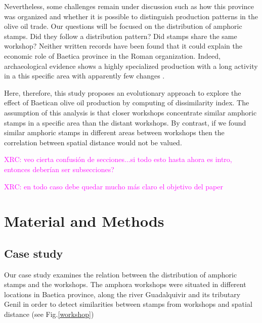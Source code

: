 \documentclass[review]{elsarticle}
\newcommand{\memo}[2]{\textcolor{#1}{#2}}
\newcommand{\xavi}[1]{\memo{magenta}{XRC: #1\\}}
\begin{document}
Nevertheless, some challenges remain under discussion such as how this province was organized and whether it is possible to distinguish production patterns in the olive oil trade. Our questions will be focused on the distribution of amphoric stamps. Did they follow a distribution pattern? Did stamps share the same workshop? Neither written records have been found that it could explain the economic role of Baetica province in the Roman organization. Indeed, archaeological evidence shows a highly specialized production with a long activity in a this specific area with apparently few changes \citep{remesal_anforas_2004}. 

Here, therefore, this study proposes an evolutionary approach to explore the effect of Baetican olive oil production by computing of dissimilarity index. The assumption of this analysis is that closer workshops concentrate similar amphoric stamps in a specific area than the distant workshops. By contrast, if we found similar amphoric stamps in different areas between workshops then the correlation between spatial distance would not be valued.  




\xavi{veo cierta confusión de secciones...si todo esto hasta ahora es intro, entonces deberían ser subsecciones?}

\xavi{en todo caso debe quedar mucho más claro el objetivo del paper}

\section{Material and Methods}

\subsection{Case study}

Our case study examines the relation between the distribution of amphoric stamps and the workshops. The amphora workshops were situated in different locations in Baetica province, along the river Guadalquivir and its tributary Genil in order to detect similarities between stamps from workshops and spatial distance (see Fig.\ref{workshop})
\end{document}
